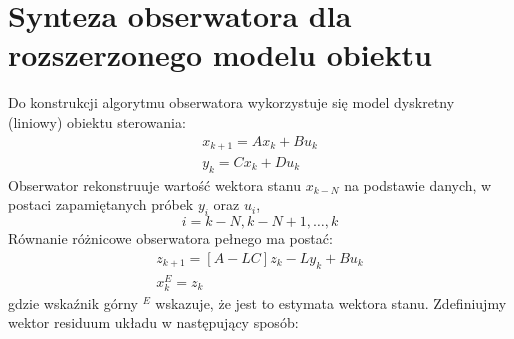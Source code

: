 \documentclass{article}
\begin{document}
	\maketitle
	\section{Synteza obserwatora dla rozszerzonego modelu obiektu}
		Do konstrukcji algorytmu obserwatora wykorzystuje się model dyskretny (liniowy)
		obiektu sterowania:
		\begin{align*}
			x_{k+1} = Ax_k + Bu_k \\ 
			y_k = C x_k + Du_k
		\end{align*}
		Obserwator rekonstruuje wartość wektora stanu $x_{k-N}$
		na podstawie danych, w postaci zapamiętanych próbek $y_i$ oraz $u_i$,
		\begin{equation}
			i=k-N, k-N+1, \ldots , k
		\end{equation}
		Równanie różnicowe obserwatora pełnego ma postać:
		\begin{align*}
			z_{k+1} = [A-LC] z_k - Ly_k + Bu_k \\ 
			x^E_k = z_k
		\end{align*}
		gdzie wskaźnik górny $^E$ wskazuje, że jest to estymata wektora stanu.
		Zdefiniujmy wektor residuum układu w następujący sposób:
\end{document}

